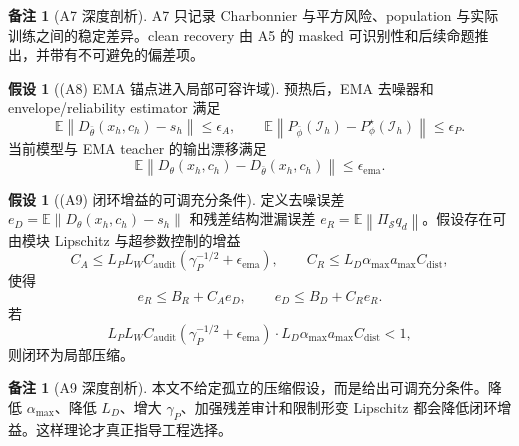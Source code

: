 \documentclass[11pt,a4paper,UTF8,fontset=fandol]{ctexart}
\theoremstyle{definition}
\newtheorem{assumption}[theorem]{假设}
\newtheorem{remark}[theorem]{备注}
\newcommand{\norm}[1]{\left\lVert#1\right\rVert}
\newcommand{\E}{\mathbb{E}}
\begin{document}
\begin{remark}[A7 深度剖析]
A7 只记录 Charbonnier 与平方风险、population 与实际训练之间的稳定差异。clean recovery 由 A5 的 masked 可识别性和后续命题推出，并带有不可避免的偏差项。
\end{remark}

\begin{assumption}[(A8) EMA 锚点进入局部可容许域]
预热后，EMA 去噪器和 envelope/reliability estimator 满足
\begin{equation}
\label{eq:anchor-quality-coreA}
    \E\norm{D_{\bar\theta}(x_h,c_h)-s_h}\le\epsilon_A,
    \qquad
    \E\norm{P_{\bar\phi}(\mathcal I_h)-P_\phi^\star(\mathcal I_h)}\le\epsilon_P.
\end{equation}
当前模型与 EMA teacher 的输出漂移满足
\begin{equation}
    \E\norm{D_\theta(x_h,c_h)-D_{\bar\theta}(x_h,c_h)}\le\epsilon_{\mathrm{ema}}.
\end{equation}
\end{assumption}

\begin{assumption}[(A9) 闭环增益的可调充分条件]
定义去噪误差 $e_D=\E\norm{D_\theta(x_h,c_h)-s_h}$ 和残差结构泄漏误差 $e_R=\E\norm{\Pi_{\mathcal S}q_d}$。假设存在可由模块 Lipschitz 与超参数控制的增益
\begin{equation}
\label{eq:gain-decomp-coreA}
    C_A\le L_P L_W C_{\mathrm{audit}}(\gamma_P^{-1/2}+\epsilon_{\mathrm{ema}}),
    \qquad
    C_R\le L_D\alpha_{\max}a_{\max}C_{\mathrm{dist}},
\end{equation}
使得
\begin{equation}
\label{eq:feedback-compression-coreA}
    e_R\le B_R+C_Ae_D,
    \qquad
    e_D\le B_D+C_Re_R.
\end{equation}
若
\begin{equation}
\label{eq:gain-condition-coreA}
    L_P L_W C_{\mathrm{audit}}(\gamma_P^{-1/2}+\epsilon_{\mathrm{ema}})
    \cdot
    L_D\alpha_{\max}a_{\max}C_{\mathrm{dist}}<1,
\end{equation}
则闭环为局部压缩。
\end{assumption}

\begin{remark}[A9 深度剖析]
本文不给定孤立的压缩假设，而是给出可调充分条件。降低 $\alpha_{\max}$、降低 $L_D$、增大 $\gamma_P$、加强残差审计和限制形变 Lipschitz 都会降低闭环增益。这样理论才真正指导工程选择。
\end{remark}
\end{document}
